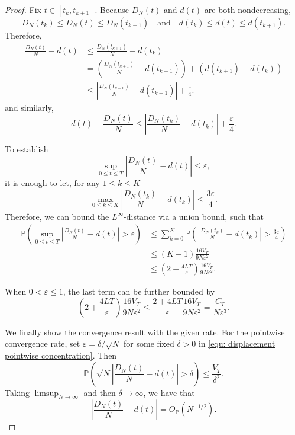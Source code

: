 \documentclass{article}
\theoremstyle{definition}
\newcommand{\pro}{\mathbb P}
\begin{document}
\begin{proof}
    Fix $t\in[t_k,t_{k+1}]$. Because $D_N(t)$ and  $d(t)$ are both nondecreasing,
    \begin{equation*}
        D_N(t_k)\leq D_N(t)\leq D_N(t_{k+1}) \quad \text{and} \quad d(t_k)\leq d(t)\leq d(t_{k+1}).
    \end{equation*}
    Therefore, 
    \begin{align*}
        \frac{D_N(t)}{N}-d(t)
        &\leq\frac{D_N(t_{k+1})}{N}-d(t_k) \\
        &=\left(\frac{D_N(t_{k+1})}{N}-d(t_{k+1})\right)+\left(d(t_{k+1})-d(t_k)\right) \\
        &\leq\left|\frac{D_N(t_{k+1})}{N}-d(t_{k+1})\right|+\frac{\varepsilon}{4}.
    \end{align*}
    and similarly,
    \[
    d(t)-\frac{D_N(t)}{N} \leq \left|\frac{D_N(t_{k})}{N}-d(t_{k})\right|+\frac{\varepsilon}{4}.
    \]

    To establish 
    \begin{equation*}
        \sup_{0\leq t\leq T}\left|\frac{D_N(t)}{N}-d(t)\right|\leq\varepsilon,
    \end{equation*}
    it is enough to let, for any $1\leq k\leq K$ 
    \begin{equation*}
        \max_{0\leq k\leq K}\left|\frac{D_N(t_k)}{N}-d(t_k)\right|\leq\frac{3\varepsilon}{4}.
    \end{equation*}
    Therefore, we can bound the $L^\infty$-distance via a union bound, such that
    \begin{align*}
        \pro\left(\sup_{0\leq t\leq T}\left|\frac{D_N(t)}{N}-d(t)\right|>\varepsilon\right)& \leq\sum_{k=0}^{K}\pro\left(\left|\frac{D_N(t_k)}{N}-d(t_k)\right|>\frac{3\varepsilon}{4}\right)\\
        & \leq (K+1) \frac{16V_T}{9N\varepsilon^2}\\
        & \leq (2+\frac{4 L T}{\varepsilon})\frac{16V_T}{9N\varepsilon^2}.
    \end{align*}

    When $0<\varepsilon\leq1$, the last term can be further bounded by  
    \begin{equation*}
        (2+\frac{4 L T}{\varepsilon})\frac{16V_T}{9N\varepsilon^2} \leq \frac{2+4 L T}{\varepsilon}\frac{16V_T}{9N\varepsilon^2} = \frac{C_T}{N\varepsilon^3}.
    \end{equation*}  


    We finally show the convergence result with the given rate. For the pointwise convergence rate, set $\varepsilon = \delta/\sqrt N$ for some fixed $\delta>0$ in \eqref{equ: displacement pointwise concentration}. Then
    \begin{equation*}
        \pro\left(\sqrt N\left|\frac{D_N(t)}{N}-d(t)\right|>\delta \right)\leq\frac{V_T}{\delta^2}.
    \end{equation*}
    Taking $\limsup_{N\to\infty}$ and then $\delta\to\infty$, we have that
    \begin{equation*}
        \left|\frac{D_N(t)}{N}-d(t)\right|=O_{\mathbb P}(N^{-1/2}).
    \end{equation*}
    

\end{proof}
\end{document}
